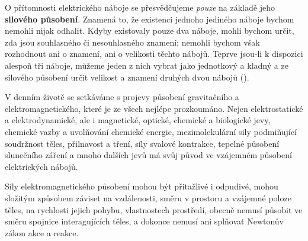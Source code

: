       O přítomnosti elektrického náboje se přesvědčujeme \emph{pouze} na základě jeho
      \textbf{silového působení}. Znamená to, že existenci jednoho jediného náboje bychom nemohli
      nijak odhalit. Kdyby existovaly pouze dva náboje, mohli bychom určit, zda jsou souhlasného či
      nesouhlasného znamení; nemohli bychom však rozhodnout ani o znamení, ani o velikosti těchto
      nábojů. Teprve jsou-li k dispozici alespoň tři náboje, můžeme jeden z nich vybrat jako
      jednotkový a kladný a ze silového působení určit velikost a znamení druhých dvou nábojů
      (\cite[s.~15]{Stoll2012}).
      
      V denním životě se setkáváme s projevy působení gravitačního a elektromagnetického, které je
      ze všech nejlépe prozkoumáno. Nejen elektrostatické a elektrodynamické, ale i magnetické,
      optické, chemické a biologické jevy, chemické vazby a uvolňování chemické energie,
      mezimolekulární sily podmiňující soudržnost těles, přilnavost a tření, síly svalové kontrakce,
      tepelné působení slunečního záření a mnoho dalších jevů má svůj původ ve vzájemném působení
      elektrických nábojů.
      
      Síly elektromagnetického působení mohou být přitažlivé i odpudivé, mohou složitým způsobem
      záviset na vzdálenosti, směru v prostoru a vzájemné poloze těles, na rychlosti jejich pohybu,
      vlastnostech prostředí, obecně nemusí působit ve směru spojnice interagujících těles, a
      dokonce nemusí ani splňovat Newtonův zákon akce a reakce.
      
